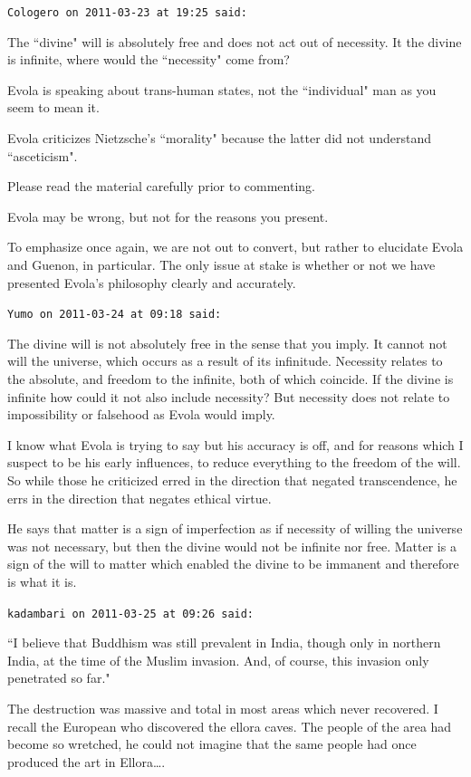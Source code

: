 \begin{footnotesize}
\begin{sffamily}
\texttt{Cologero on 2011-03-23 at 19:25 said: }

The ``divine" will is absolutely free and does not act out of necessity. It the divine is infinite, where would the ``necessity" come from?

Evola is speaking about trans-human states, not the ``individual" man as you seem to mean it.

Evola criticizes Nietzsche's ``morality" because the latter did not understand ``asceticism".

Please read the material carefully prior to commenting.

Evola may be wrong, but not for the reasons you present.

To emphasize once again, we are not out to convert, but rather to elucidate Evola and Guenon, in particular. The only issue at stake is whether or not we have presented Evola's philosophy clearly and accurately.


\hfill

\texttt{Yumo on 2011-03-24 at 09:18 said: }

The divine will is not absolutely free in the sense that you imply. It cannot not will the universe, which occurs as a result of its infinitude. Necessity relates to the absolute, and freedom to the infinite, both of which coincide. If the divine is infinite how could it not also include necessity? But necessity does not relate to impossibility or falsehood as Evola would imply.

I know what Evola is trying to say but his accuracy is off, and for reasons which I suspect to be his early influences, to reduce everything to the freedom of the will. So while those he criticized erred in the direction that negated transcendence, he errs in the direction that negates ethical virtue.

He says that matter is a sign of imperfection as if necessity of willing the universe was not necessary, but then the divine would not be infinite nor free. Matter is a sign of the will to matter which enabled the divine to be immanent and therefore is what it is.


\hfill

\texttt{kadambari on 2011-03-25 at 09:26 said: }

``I believe that Buddhism was still prevalent in India, though only in northern India, at the time of the Muslim invasion. And, of course, this invasion only penetrated so far."

The destruction was massive and total in most areas which never recovered. I recall the European who discovered the ellora caves. The people of the area had become so wretched, he could not imagine that the same people had once produced the art in Ellora….



\end{sffamily}
\end{footnotesize}
